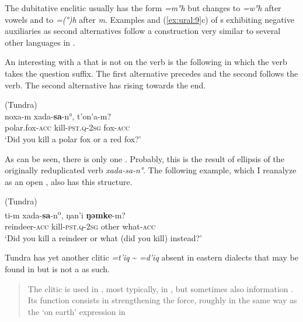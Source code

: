 \noindent The dubitative enclitic usually has the form \textit{=m}\textit{°h} but changes to \textit{=w}\textit{°h} after vowels and to \textit{=(}\textit{°)}\textit{h} after \textit{m}. Examples  and (\ref{ex:ural:9}c) of s exhibiting negative auxiliaries as second alternatives follow a construction very similar to several other languages in .

An interesting  with a  that is not on the verb is the following in which the verb takes the question suffix. The first alternative precedes and the second follows the verb. The second alternative has rising  towards the end.

\ea%
    \label{ex:ural:10}
     (Tundra)\\
    \gll noxa-m xada-\textbf{{sa}}{-n°,} t{’on}{’a-m?}\\
    polar.fox-\textsc{acc}  kill-\textsc{pst}.\textsc{q}-2\textsc{sg}  fox-\textsc{acc}\\
    \glt ‘Did you kill a polar fox or a red fox?’
    \z

\noindent As can be seen, there is only one . Probably, this is the result of ellipsis of the originally reduplicated verb \textit{xada-sa-n°}. The following example, which I reanalyze as an open , also has this structure.

\ea%
    \label{ex:ural:11}
     (Tundra)\\
    \gll ti-m    xada-\textbf{{sa}}{-n}{\textsuperscript{o}},  ŋan’i \textbf{{ŋ}}\textbf{{ə}}\textbf{{mke}}{-m?}\\
    reindeer-\textsc{acc}  kill-\textsc{pst}.\textsc{q}-2\textsc{sg}  other  what-\textsc{acc}\\
    \glt ‘Did you kill a reindeer or what (did you kill) instead?’ \citep[268]{Nikolaeva2014}
    \z

Tundra  has yet another clitic \textit{=t’iq} {\textasciitilde} \textit{=d’iq} absent in eastern dialects that may be found in  but is not a  as such.

\begin{quote}
The  clitic is used in , most typically, in , but sometimes also information . Its function consists in strengthening the  force, roughly in the same way as the ‘on earth’ expression in  \citep[123]{Nikolaeva2014}
\end{quote}

